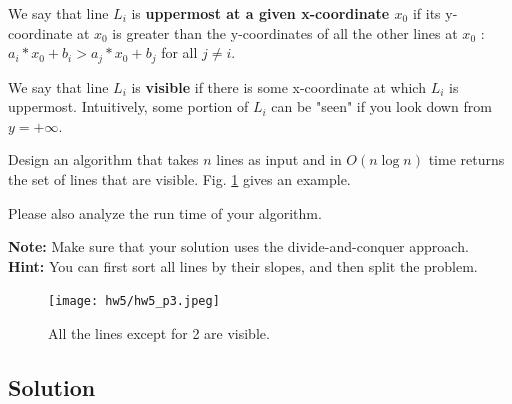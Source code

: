 \documentclass[11pt]{article}
\begin{document}
We say that line $L_i$ is {\bf uppermost at a given
x-coordinate $x_0$} if its y-coordinate at $x_0$ is greater than the y-coordinates
of all the other lines at $x_0$ : $a_i*x_0 + b_i > a_j * x_0 + b_j$ for all $j \neq i$. 


We say that line $L_i$ is
{\bf visible} if there is some x-coordinate at which $L_i$ is uppermost.
Intuitively,
some portion of $L_i$ can be "seen" if you look down from $y = +\infty$.


Design an algorithm that takes $n$ lines as input and in $O(n \log{n})$ time
returns the set of lines that are visible. Fig. \ref{Fig1} gives an example. 

Please also analyze the run time of your algorithm.


\noindent
\textbf{Note:} Make sure that your solution uses the divide-and-conquer approach. \\
\textbf{Hint:} You can first sort all lines by their slopes, and then split the problem. \\




\begin{figure}[H]
\centering
\texttt{[image: hw5/hw5\_p3.jpeg]} 
\caption{All the lines except for 2 are visible.}
\label{Fig1} 
\end{figure}
 
 

\subsection*{Solution}
\end{document}
